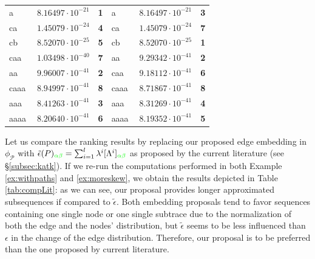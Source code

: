 \begin{table}[!t]
\begin{tabular}{lc|l||lc|l}
		a & $\;8.16497\cdot10^{-21}$ & \textbf{\color{blue}1} & a & $\;8.16497\cdot 10^{-21}$ & \textbf{\color{red}3} \\
		ca & $\;1.45079\cdot10^{-24}$ & \textbf{\color{blue}4} & ca &  $\;1.45079\cdot 10^{-24}$ & \textbf{\color{red}7}\\
		cb & $\;8.52070\cdot10^{-25}$ & \textbf{\color{blue}5} & cb & $\;8.52070\cdot10^{-25}$& \textbf{\color{blue}1}\\
		caa & $\;1.03498\cdot10^{-40}$ & \textbf{\color{blue}7} & aa & $\;9.29342\cdot10^{-41}$ & \textbf{\color{blue}2}\\
		aa & $\;9.96007\cdot10^{-41}$ & \textbf{\color{red}2} & caa & $\;9.18112\cdot10^{-41}$ & \textbf{\color{blue}6}\\
		caaa & $\;8.94997\cdot10^{-41}$ & \textbf{\color{red}8} & caaa & $\;8.71867\cdot10^{-41}$ & \textbf{\color{blue}8}\\
		aaa & $\;8.41263\cdot10^{-41}$ &  \textbf{\color{red}3} & aaa & $\;8.31269\cdot10^{-41}$ & \textbf{\color{red}4}\\
		aaaa & $\;8.20640\cdot10^{-41}$ &  \textbf{\color{red}6} & aaaa & $\;8.19352\cdot10^{-41}$ & \textbf{\color{red}5}\\
		
		\bottomrule
	\end{tabular}
\end{table}

\begin{example}\label{ex:cmpexample}
	Let us compare the ranking results by replacing our proposed edge embedding in $\phi_{\mathcal{P}}$ with $\tilde{\epsilon}(P)_{\color{green}\alpha\beta}=\sum_{i=1}^l\lambda^i[\Lambda^i]_{\color{green}\alpha\beta}$ as proposed by the current literature (see \S\ref{subsec:katk}). If we re-run the computations performed in both Example \ref{ex:withpaths} and \ref{ex:moreskew}, we obtain the results depicted in Table \ref{tab:compLit}: as we can see, our proposal provides longer approximated subsequences if compared to $\tilde{\epsilon}$. Both embedding proposals tend to favor sequences containing one single node or one single subtrace due to the normalization of both  the edge and the nodes' distribution, but $\tilde{\epsilon}$ seems to be less influenced than $\epsilon$ in the change of the edge distribution. Therefore, our proposal is to be preferred than the one proposed by current literature.
\end{example}


